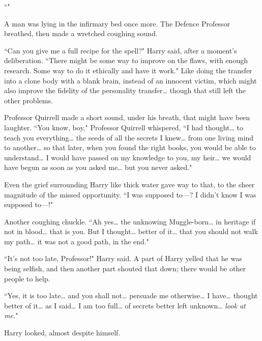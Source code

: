 ``"

A man was lying in the infirmary bed once more. The Defence Professor breathed, then made a wretched coughing sound.

``Can you give me a full recipe for the spell?" Harry said, after a moment's deliberation. ``There might be some way to improve on the flaws, with enough research. Some way to do it ethically and have it work." Like doing the transfer into a clone body with a blank brain, instead of an innocent victim, which might also improve the fidelity of the personality transfer{\ldots} though that still left the other problems.

Professor Quirrell made a short sound, under his breath, that might have been laughter. ``You know, boy," Professor Quirrell whispered, ``I had thought{\ldots} to teach you everything{\ldots} the seeds of all the secrets I knew{\ldots} from one living mind to another{\ldots} so that later, when you found the right books, you would be able to understand{\ldots} I would have passed on my knowledge to you, my heir{\ldots} we would have begun as soon as you asked me{\ldots} but you never asked."

Even the grief surrounding Harry like thick water gave way to that, to the sheer magnitude of the missed opportunity. ``I was supposed to—? I didn't know I was supposed to—!"

Another coughing chuckle. ``Ah yes{\ldots} the unknowing Muggle-born{\ldots} in heritage if not in blood{\ldots} that is you. But I thought{\ldots} better of it{\ldots} that you should not walk my path{\ldots} it was not a good path, in the end."

``It's not too late, Professor!" Harry said. A part of Harry yelled that he was being selfish, and then another part shouted that down; there would be other people to help.

``Yes, it is too late{\ldots} and you shall not{\ldots} persuade me otherwise{\ldots} I have{\ldots} thought better of it{\ldots} as I said{\ldots} I am too full{\ldots} of secrets better left unknown{\ldots} \emph{look at me.}"

Harry looked, almost despite himself.

